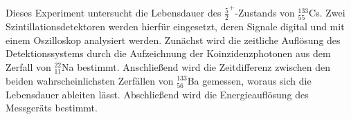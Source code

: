 Dieses Experiment untersucht die Lebensdauer des $\frac{5}{2}^+$-Zustands von $^{133}_{55}$Cs. Zwei Szintillationsdetektoren werden hierfür eingesetzt, deren Signale digital und mit einem Oszilloskop analysiert werden. Zunächst wird die zeitliche Auflösung des Detektionssystems durch die Aufzeichnung der Koinzidenzphotonen aus dem Zerfall von $^{22}_{11}$Na bestimmt. Anschließend wird die Zeitdifferenz zwischen den beiden wahrscheinlichsten Zerfällen von $^{133}_{56}$Ba gemessen, woraus sich die Lebensdauer ableiten lässt. Abschließend wird die Energieauflösung des Messgeräts bestimmt. 